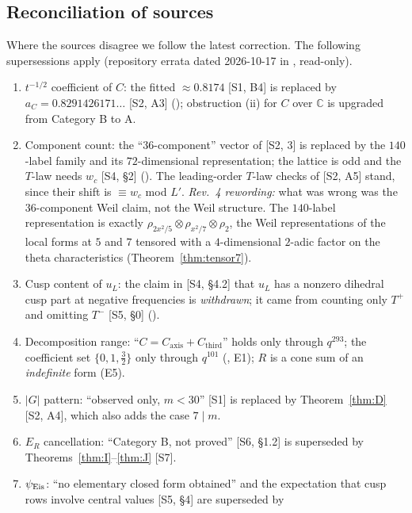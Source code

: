 \documentclass[11pt]{article}
\theoremstyle{definition}
\theoremstyle{plain}
\newcommand{\C}{\mathbb{C}}
\newcommand{\Cthird}{C_{\mathrm{third}}}
\newcommand{\Caxis}{C_{\mathrm{axis}}}
\newcommand{\src}[1]{\textup{[S#1]}}
\begin{document}
\subsection{Reconciliation of sources}\label{sec:recon}
Where the sources disagree we follow the latest correction. The following supersessions apply (repository errata dated 2026-10-17 in
, read-only).
\begin{enumerate}[leftmargin=2em]
\item $t^{-1/2}$ coefficient of $C$: the fitted $\approx0.8174$ \src{1, B4} is replaced by $a_C=0.8291426171\ldots$ \src{2, A3}
(); obstruction (ii) for $C$ over $\C$ is upgraded from Category B to A.
\item Component count: the ``36-component'' vector of \src{2, 3} is replaced by the $140$-label family and its $72$-dimensional representation; the
lattice is odd and the $T$-law needs $w_c$ \src{4, \S2} (). The leading-order $T$-law checks of \src{2, A5} stand,
since their shift is $\equiv w_c$ mod $L'$. \emph{Rev.~4 rewording:} what was wrong was the $36$-component Weil claim, not the Weil structure. The
$140$-label representation is exactly $\rho_{2x^2/5}\otimes\rho_{x^2/7}\otimes\rho_2$, the Weil representations of the local forms at $5$ and $7$ tensored with a
$4$-dimensional $2$-adic factor on the theta characteristics (Theorem~\ref{thm:tensor7}).
\item Cusp content of $u_L$: the claim in \src{4, \S4.2} that $u_L$ has a nonzero dihedral cusp part at negative frequencies is \emph{withdrawn};
it came from counting only $T^+$ and omitting $T^-$ \src{5, \S0} ().
\item Decomposition range: ``$C=\Caxis+\Cthird$'' holds only through $q^{293}$; the coefficient set $\{0,1,\tfrac32\}$ only through $q^{101}$
(, E1); $R$ is a cone sum of an \emph{indefinite} form (E5).
\item $|G|$ pattern: ``observed only, $m<30$'' \src{1} is replaced by Theorem~\ref{thm:D} \src{2, A4}, which also adds the case $7\mid m$.
\item $E_R$ cancellation: ``Category B, not proved'' \src{6, \S1.2} is superseded by Theorems~\ref{thm:I}--\ref{thm:J} \src{7}.
\item $\psi_{\rm Eis}$: ``no elementary closed form obtained'' and the expectation that cusp rows involve central values \src{5, \S4} are superseded by

\end{enumerate}
\end{document}
